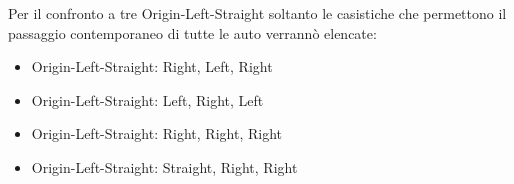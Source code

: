 Per il confronto a tre Origin-Left-Straight soltanto le casistiche
che permettono il passaggio contemporaneo di tutte le auto verrannò elencate:

\begin{itemize}
    \item Origin-Left-Straight: Right, Left, Right
    \item Origin-Left-Straight: Left, Right, Left
    \item Origin-Left-Straight: Right, Right, Right
    \item Origin-Left-Straight: Straight, Right, Right
\end{itemize}




